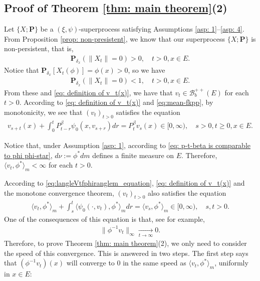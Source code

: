 \subsection{Proof of Theorem \ref{thm: main theorem}(2)}
\label{sec: proof of result 2}
	Let $\{X; \mathbf P\}$ be a $(\xi, \psi)$-superprocess satisfying
	Assumptions \ref{asp: 1}--\ref{asp: 4}.
	From Proposition \ref{prop: non-presistent}, we know that our superprocess $\{X;\mathbf P\}$ is non-persistent, that is,
\begin{align}
    \mathbf P_{\delta_x}(\|X_t\| = 0)
    > 0,
    \quad t>0, x \in E.
\end{align}
	Notice that $\mathbf P_{\delta_x}[X_t(\phi)] = \phi(x)>0$, so we have
\begin{align}
    \mathbf P_{\delta_x}(\|X_t\|= 0)<1,
    \quad t>0, x \in E.
\end{align}
	From these and \eqref{eq: definition of v_t(x)}, we have that $v_t \in \mathscr B^{++}_b(E)$ for each $t > 0$.
	According to \eqref{eq: definition of v_t(x)} and \eqref{eq:mean-fkpp}, by monotonicity,
	we see that $(v_t)_{t > 0}$ satisfies the equation
\begin{align}
	v_{s+t}(x) + \int_0^t P^\beta_{t-r} \psi_0(x,v_{s+r}) dr
	= P^\beta_t v_s(x)
	\in [0,\infty),
	\quad s>0, t \geq 0,x \in E.
\end{align}

	Notice that, under Assumption \ref{asp: 1}, according to \eqref{eq: p-t-beta is comparable to phi phi-star}, $d\nu:= \phi^* dm$ defines a finite measure on $E$.
	Therefore, $\langle v_t, \phi^*\rangle_m < \infty$ for each $t>0$.

	According to \eqref{eq:langleVtfphiranglem_equation}, \eqref{eq: definition of v_t(x)} and the monotone convergence theorem,
	$(v_t)_{t> 0}$ also satisfies the equation
\begin{align} \label{eq: equation of <vt,phi>}
	\langle v_t,\phi^*\rangle_m + \int_s^t \langle \psi_0(\cdot ,v_t) , \phi^*\rangle_m dr
	= \langle v_s,\phi^*\rangle_m
	\in [0,\infty),
	\quad s, t > 0.
\end{align}
	One of the consequences of this equation is that, see \cite[Lemma 5.1]{RenSongSun2017Spine} for example,
\begin{align} \label{eq: uniform converges to 0}
    \|\phi^{-1}v_t\|_{\infty} \xrightarrow[t\to \infty]{} 0.
\end{align}
	Therefore, to prove Theorem \ref{thm: main theorem}(2), we only need to consider the speed of this convergence.
	This is answered in two steps.
	The first step says that $(\phi^{-1}v_t)(x)$ will converge to $0$ in the same speed as $\langle v_t,\phi^*\rangle_m $, uniformly in $x\in E$:

